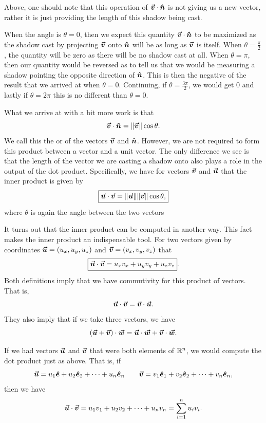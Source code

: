         \noindent Above, one should note that this operation of $\boldsymbol{\boldsymbol{\vec{v}}}\cdot \boldsymbol{\hat{n}}$ is not giving us a new vector, rather it is just providing the length of this shadow being cast.
        
        When the angle is $\theta=0$, then we expect this quantity $\boldsymbol{\boldsymbol{\vec{v}}} \cdot \boldsymbol{\hat{n}}$ to be maximized as the shadow cast by projecting $\boldsymbol{\boldsymbol{\vec{v}}}$ onto $\boldsymbol{\hat{n}}$ will be as long as $\boldsymbol{\boldsymbol{\vec{v}}}$ is itself. When $\theta=\frac{\pi}{2}$, the quantity will be zero as there will be no shadow cast at all. When $\theta=\pi$, then our quantity would be reversed as to tell us that we would be measuring a shadow pointing the opposite direction of $\boldsymbol{\hat{n}}$. This is then the negative of the result that we arrived at when $\theta=0$.  Continuing, if $\theta=\frac{3\pi}{2}$, we would get 0 and lastly if $\theta=2\pi$ this is no different than $\theta=0$.  
        
        What we arrive at with a bit more work is that
        \[
        \boldsymbol{\boldsymbol{\vec{v}}}\cdot \boldsymbol{\hat{n}}=\|\boldsymbol{\boldsymbol{\vec{v}}}\| \cos \theta.
        \]
        We call this the  or  of the vectors $\boldsymbol{\boldsymbol{\vec{v}}}$ and $\boldsymbol{\hat{n}}$. However, we are not required to form this product between a vector and a unit vector. The only difference we see is that the length of the vector we are casting a shadow onto also plays a role in the output of the dot product. Specifically, we have for vectors $\boldsymbol{\boldsymbol{\vec{v}}}$ and $\boldsymbol{\boldsymbol{\vec{u}}}$ that the inner product is given by
        \[
        \boxed{\boldsymbol{\boldsymbol{\vec{u}}} \cdot \boldsymbol{\boldsymbol{\vec{v}}} = \|\boldsymbol{\boldsymbol{\vec{u}}}\|\|\boldsymbol{\boldsymbol{\vec{v}}}\| \cos \theta,}
        \]
        where $\theta$ is again the angle between the two vectors
        
        It turns out that the inner product can be computed in another way.  This fact makes the inner product an indispensable tool. For two vectors given by coordinates $\boldsymbol{\boldsymbol{\vec{u}}}=(u_x,u_y,u_z)$ and $\boldsymbol{\boldsymbol{\vec{v}}}=(v_x,v_y,v_z)$ that
        \[
        \boxed{\boldsymbol{\boldsymbol{\vec{u}}} \cdot \boldsymbol{\boldsymbol{\vec{v}}}= u_xv_x + u_y v_y + u_z v_z}.
        \]
        Both definitions imply that we have commutivity for this product of vectors. That is,
        \[
        \boldsymbol{\boldsymbol{\vec{u}}}\cdot \boldsymbol{\boldsymbol{\vec{v}}} = \boldsymbol{\boldsymbol{\vec{v}}} \cdot \boldsymbol{\boldsymbol{\vec{u}}}.
        \]
        They also imply that if we take three vectors, we have
        \[
        (\boldsymbol{\boldsymbol{\vec{u}}}+\boldsymbol{\boldsymbol{\vec{v}}})\cdot \boldsymbol{\boldsymbol{\vec{w}}} = \boldsymbol{\boldsymbol{\vec{u}}} \cdot \boldsymbol{\boldsymbol{\vec{w}}} + \boldsymbol{\boldsymbol{\vec{v}}} \cdot \boldsymbol{\boldsymbol{\vec{w}}}.
        \]
        
        \begin{remark}
        If we had vectors $\boldsymbol{\boldsymbol{\vec{u}}}$ and $\boldsymbol{\boldsymbol{\vec{v}}}$ that were both elements of $\mathbb{R}^n$, we would compute the dot product just as above. That is, if 
        \[
        \boldsymbol{\boldsymbol{\vec{u}}} = u_1 \boldsymbol{\hat{e}} + u_2 \boldsymbol{\hat{e}}_2 + \cdots + u_n \boldsymbol{\hat{e}}_n \qquad \boldsymbol{\boldsymbol{\vec{v}}} = v_1 \boldsymbol{\hat{e}}_1 + v_2 \boldsymbol{\hat{e}}_2 + \cdots + v_n \boldsymbol{\hat{e}}_n,
        \]
        then we have
        \[
        \boldsymbol{\boldsymbol{\vec{u}}} \cdot \boldsymbol{\boldsymbol{\vec{v}}} = u_1 v_1 + u_2 v_2 +\cdots + u_n v_n = \sum_{i=1}^n u_i v_i.
        \]
        \end{remark}
        
